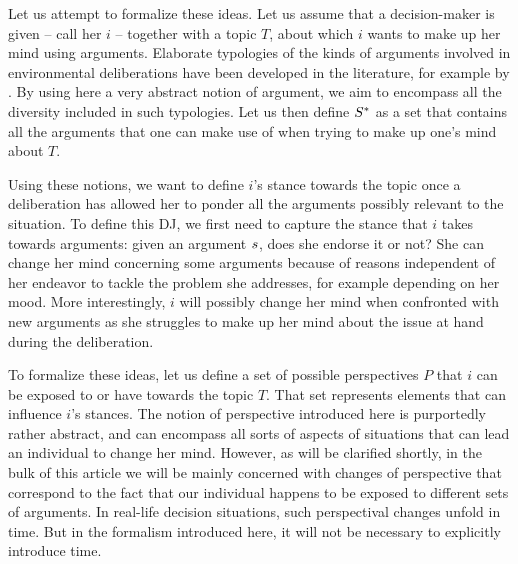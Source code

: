 \documentclass[version=3.21, pagesize, twoside=off, bibliography=totoc, DIV=calc, fontsize=12pt, a4paper, french, english]{scrartcl}
\begin{document}
Let us attempt to formalize these ideas. Let us assume that a decision-maker is given -- call her $i$ -- together with a topic $T$, about which $i$ wants to make up her mind using arguments. Elaborate typologies of the kinds of arguments involved in environmental deliberations have been developed in the literature, for example by \citet{chateauraynaud_contrainte_2007}. By using here a very abstract notion of argument, we aim to encompass all the diversity included in such typologies. Let us then define $S^*$ as a set that contains all the arguments that one can make use of when trying to make up one’s mind about $T$.

Using these notions, we want to define $i$’s stance towards the topic once a deliberation has allowed her to ponder all the arguments possibly relevant to the situation. To define this \ac{DJ}, we first need to capture the stance that $i$ takes towards arguments: given an argument $s$, does she endorse it or not? She can change her mind concerning some arguments because of reasons independent of her endeavor to tackle the problem she addresses, for example depending on her mood. More interestingly, $i$ will possibly change her mind when confronted with new arguments as she struggles to make up her mind about the issue at hand during the deliberation.

To formalize these ideas, let us define a set of possible perspectives $P$ that $i$ can be exposed to or have towards the topic $T$. That set represents elements that can influence $i$’s stances. The notion of perspective introduced here is purportedly rather abstract, and can encompass all sorts of aspects of situations that can lead an individual to change her mind. However, as will be clarified shortly, in the bulk of this article we will be mainly concerned with changes of perspective that correspond to the fact that our individual happens to be exposed to different sets of arguments. In real-life decision situations, such perspectival changes unfold in time. But in the formalism introduced here, it will not be necessary to explicitly introduce time.
\end{document}
